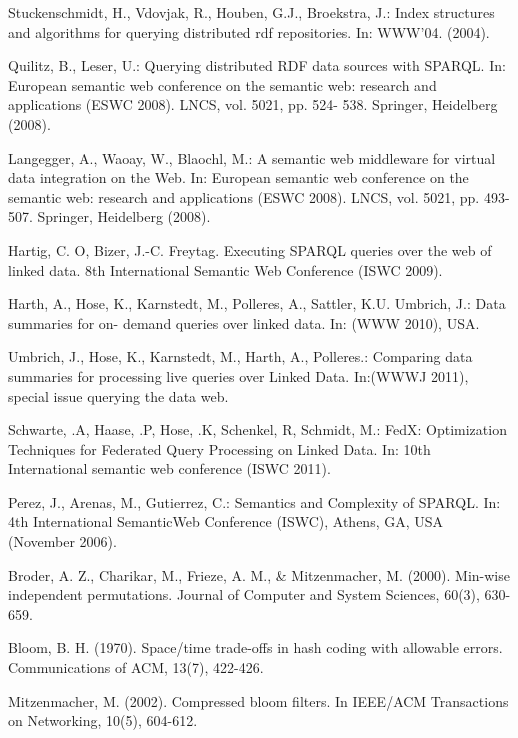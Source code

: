 \documentclass{sig-alternate}  %
\begin{document}
%
%
\begin{thebibliography}{10}
Stuckenschmidt, H., Vdovjak, R., Houben, G.J., Broekstra,
J.: Index structures and algorithms for querying distributed rdf repositories.
In: WWW'04. (2004).

Quilitz, B., Leser, U.: Querying distributed RDF data
sources with SPARQL. In: European semantic web conference on the semantic
web: research and applications (ESWC 2008). LNCS, vol. 5021, pp. 524-
538. Springer, Heidelberg (2008).

Langegger, A., Waoay, W., Blaochl, M.: A semantic web
middleware for virtual data integration on the Web. In: European semantic
web conference on the semantic web: research and applications (ESWC
2008). LNCS, vol. 5021, pp. 493-507. Springer, Heidelberg (2008).

Hartig, C. O, Bizer, J.-C. Freytag. Executing SPARQL
queries over the web of linked data. 8th International Semantic Web
Conference (ISWC 2009).

Harth, A., Hose, K., Karnstedt, M., Polleres, A.,
Sattler, K.U. Umbrich, J.: Data summaries for on- demand queries over
linked data. In: (WWW 2010), USA.

Umbrich, J., Hose, K., Karnstedt, M., Harth, A., Polleres.:
Comparing data summaries for processing live queries over Linked Data.
In:(WWWJ 2011), special issue querying the data web. 

Schwarte, .A, Haase, .P, Hose, .K, Schenkel, R, Schmidt,
M.: FedX: Optimization Techniques for Federated Query Processing on
Linked Data. In: 10th International semantic web conference (ISWC
2011).

Perez, J., Arenas, M., Gutierrez, C.: Semantics and
Complexity of SPARQL. In: 4th International SemanticWeb Conference
(ISWC), Athens, GA, USA (November 2006).

Broder, A. Z., Charikar, M., Frieze, A. M., \& Mitzenmacher,
M. (2000). Min-wise independent permutations. Journal of Computer
and System Sciences, 60(3), 630-659.

Bloom, B. H. (1970). Space/time trade-offs in hash
coding with allowable errors. Communications of ACM, 13(7), 422-426.

Mitzenmacher, M. (2002). Compressed bloom filters.
In IEEE/ACM Transactions on Networking, 10(5), 604-612.


\end{thebibliography}
\end{document}
